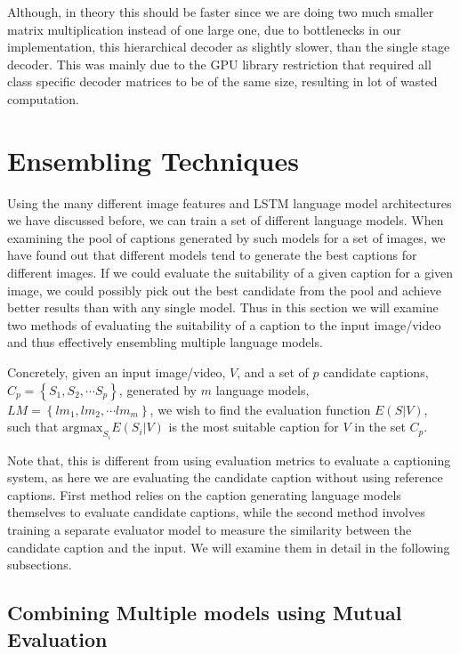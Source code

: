 Although, in theory this should be faster since we are doing two much smaller
matrix multiplication instead of one large one, due to bottlenecks in our
implementation, this hierarchical decoder as slightly slower, than the single
stage decoder.
This was mainly due to the GPU library restriction that required all class
specific decoder matrices to be of the same size, resulting in lot of wasted
computation.
\section{Ensembling Techniques}
Using the many different image features and LSTM language model architectures we
have discussed before, we can train a set of different language models.
When examining the pool of captions generated by such models for a set of
images, we have found out that different models tend to generate the best
captions for different images.
If we could evaluate the suitability of a given caption for a given image, we
could possibly pick out the best candidate from the pool and achieve better
results than with any single model.
Thus in this section we will examine two methods of evaluating the suitability
of a caption to the input image/video and thus effectively ensembling multiple
language models.

Concretely, given an input image/video, $V$, and a set of $p$ candidate
captions, $C_p = \left\{S_1,S_2,\cdots S_p \right\}$, generated by $m$ language
models, $LM = \left\{lm_1,lm_2,\cdots lm_m \right\}$, we wish to find the
evaluation function $E(S|V)$, such that $\text{argmax}_{S_i} E(S_i|V)$ is the
most suitable caption for $V$ in the set $C_p$.

Note that, this is different from using evaluation metrics to evaluate a
captioning system, as here we are evaluating the candidate caption without using
reference captions.
First method relies on the caption generating language models themselves to
evaluate candidate captions, while the second method involves training a
separate evaluator model to measure the similarity between the candidate caption
and the input.
We will examine them in detail in the following subsections.

\subsection{Combining Multiple models using Mutual Evaluation}

